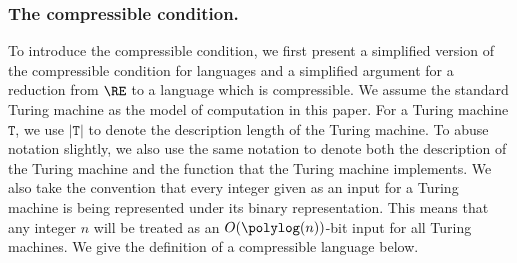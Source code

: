 \subsubsection{The compressible condition. } \label{sec:introcompression}


To introduce the compressible condition, we first present a simplified version of the compressible condition for languages and a simplified argument for a reduction from $\RE$ to a language which is compressible. We assume the standard Turing machine as the model of computation in this paper. For a Turing machine $\mathtt{T}$, we use $|\mathtt{T}|$ to denote the description length of the Turing machine. To abuse notation slightly, we also use the same notation to denote both the description of the Turing machine and the function that the Turing machine implements. We also take the convention that every integer given as an input for a Turing machine is being represented under its binary representation. This means that any integer $n$ will be treated as an $O(\polylog(n))$-bit input for all Turing machines. We give the definition of a compressible language below. 



